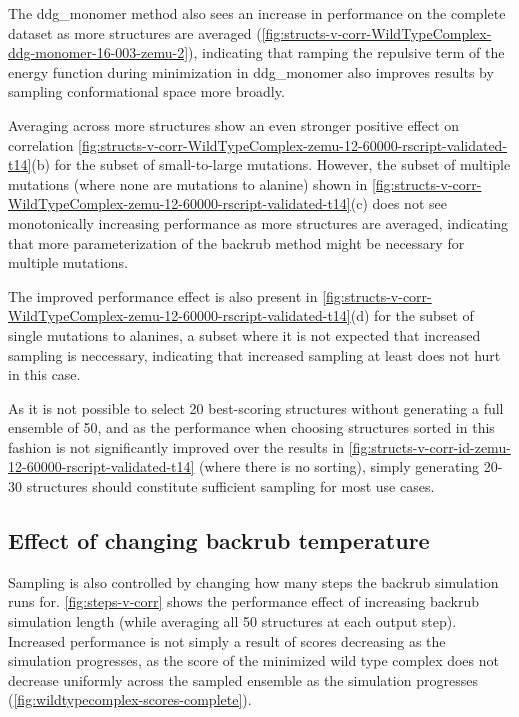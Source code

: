 The ddg\_monomer method also sees an increase in performance on the complete dataset as more structures are averaged (\cref{fig:structs-v-corr-WildTypeComplex-ddg-monomer-16-003-zemu-2}), indicating that ramping the repulsive term of the energy function during minimization in ddg\_monomer also improves results by sampling conformational space more broadly.

Averaging across more structures show an even stronger positive effect on correlation \cref{fig:structs-v-corr-WildTypeComplex-zemu-12-60000-rscript-validated-t14}(b) for the subset of small-to-large mutations.
However, the subset of multiple mutations (where none are mutations to alanine) shown in \cref{fig:structs-v-corr-WildTypeComplex-zemu-12-60000-rscript-validated-t14}(c) does not see monotonically increasing performance as more structures are averaged, indicating that more parameterization of the backrub method might be necessary for multiple mutations.

The improved performance effect is also present in \cref{fig:structs-v-corr-WildTypeComplex-zemu-12-60000-rscript-validated-t14}(d) for the subset of single mutations to alanines, a subset where it is not expected that increased sampling is neccessary, indicating that increased sampling at least does not hurt in this case.

As it is not possible to select 20 best-scoring structures without generating a full ensemble of 50, and as the performance when choosing structures sorted in this fashion is not significantly improved over the results in \cref{fig:structs-v-corr-id-zemu-12-60000-rscript-validated-t14} (where there is no sorting), simply generating 20-30 structures should constitute sufficient sampling for most use cases.

\subsection{Effect of changing backrub temperature}

Sampling is also controlled by changing how many steps the backrub simulation runs for.
\cref{fig:steps-v-corr} shows the performance effect of increasing backrub simulation length (while averaging all 50 structures at each output step).
Increased performance is not simply a result of scores decreasing as the simulation progresses, as the score of the minimized wild type complex does not decrease uniformly across the sampled ensemble as the simulation progresses (\cref{fig:wildtypecomplex-scores-complete}).

